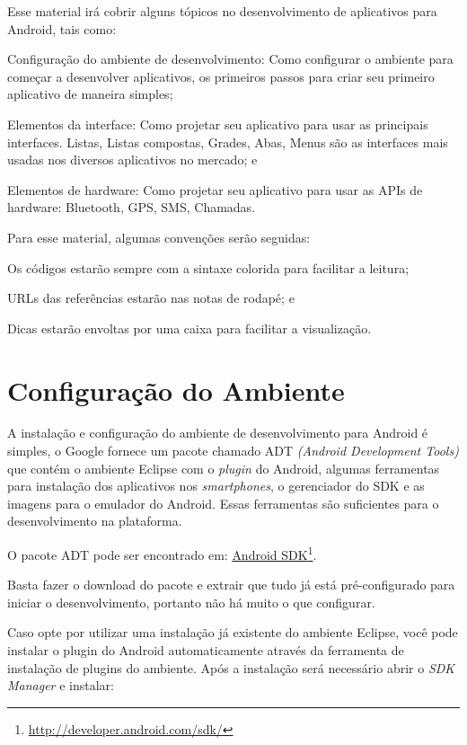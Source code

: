 \documentclass[a4paper,12pt,brazil,oneside]{book}
\begin{document}
\begin{singlespace}
Esse material irá cobrir alguns tópicos no desenvolvimento de aplicativos para Android, tais como:
\bi
  \item Configuração do ambiente de desenvolvimento: Como configurar o ambiente para começar a desenvolver aplicativos, os primeiros passos para criar seu primeiro aplicativo de maneira simples;
  \item Elementos da interface: Como projetar seu aplicativo para usar as principais interfaces. Listas, Listas compostas, Grades, Abas, Menus são as interfaces mais usadas nos diversos aplicativos no mercado; e
  \item Elementos de hardware: Como projetar seu aplicativo para usar as APIs de hardware: Bluetooth, GPS, SMS, Chamadas.
\ei

Para esse material, algumas convenções serão seguidas: 
\bi
  \item Os códigos estarão sempre com a sintaxe colorida para facilitar a leitura;
  \item URLs das referências estarão nas notas de rodapé; e
  \item Dicas estarão envoltas por uma caixa para facilitar a visualização.
\ei

\newpage

\section{Configuração do Ambiente}

A instalação e configuração do ambiente de desenvolvimento para Android é simples, o Google fornece um pacote chamado ADT \emph{(Android Development Tools)} que contém o ambiente Eclipse com o \emph{plugin} do Android, algumas ferramentas para instalação dos aplicativos nos \emph{smartphones}, o gerenciador do SDK e as imagens para o emulador do Android. Essas ferramentas são suficientes para o desenvolvimento na plataforma.

O pacote ADT pode ser encontrado em: \href{http://developer.android.com/sdk/}{Android SDK}\footnote{\href{http://developer.android.com/sdk/}{http://developer.android.com/sdk/}}. 

Basta fazer o download do pacote e extrair que tudo já está pré-configurado para iniciar o desenvolvimento, portanto não há muito o que configurar.

Caso opte por utilizar uma instalação já existente do ambiente Eclipse, você pode instalar o plugin do Android automaticamente através da ferramenta de instalação de plugins do ambiente. Após a instalação será necessário abrir o \emph{SDK Manager} e instalar:


\end{singlespace}
\end{document}
